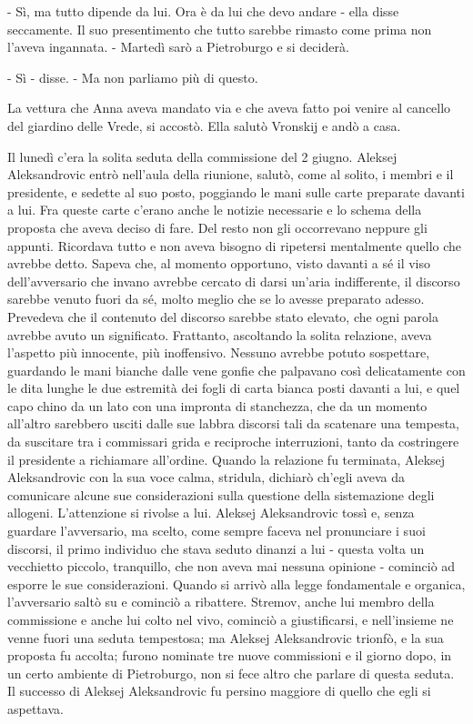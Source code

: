 - Sì, ma tutto dipende da lui. Ora è da lui che devo andare - ella disse seccamente. Il suo presentimento che tutto sarebbe rimasto come prima non l'aveva ingannata. - Martedì sarò a Pietroburgo e si deciderà. 

- Sì - disse. - Ma non parliamo più di questo. 

La vettura che Anna aveva mandato via e che aveva fatto poi venire al cancello del giardino delle Vrede, si accostò. Ella salutò Vronskij e andò a casa. 

\label{xxiii-2} 

Il lunedì c'era la solita seduta della commissione del 2 giugno. Aleksej Aleksandrovic entrò nell'aula della riunione, salutò, come al solito, i membri e il presidente, e sedette al suo posto, poggiando le mani sulle carte preparate davanti a lui. Fra queste carte c'erano anche le notizie necessarie e lo schema della proposta che aveva deciso di fare. Del resto non gli occorrevano neppure gli appunti. Ricordava tutto e non aveva bisogno di ripetersi mentalmente quello che avrebbe detto. Sapeva che, al momento opportuno, visto davanti a sé il viso dell'avversario che invano avrebbe cercato di darsi un'aria indifferente, il discorso sarebbe venuto fuori da sé, molto meglio che se lo avesse preparato adesso. Prevedeva che il contenuto del discorso sarebbe stato elevato, che ogni parola avrebbe avuto un significato. Frattanto, ascoltando la solita relazione, aveva l'aspetto più innocente, più inoffensivo. Nessuno avrebbe potuto sospettare, guardando le mani bianche dalle vene gonfie che palpavano così delicatamente con le dita lunghe le due estremità dei fogli di carta bianca posti davanti a lui, e quel capo chino da un lato con una impronta di stanchezza, che da un momento all'altro sarebbero usciti dalle sue labbra discorsi tali da scatenare una tempesta, da suscitare tra i commissari grida e reciproche interruzioni, tanto da costringere il presidente a richiamare all'ordine. Quando la relazione fu terminata, Aleksej Aleksandrovic con la sua voce calma, stridula, dichiarò ch'egli aveva da comunicare alcune sue considerazioni sulla questione della sistemazione degli allogeni. L'attenzione si rivolse a lui. Aleksej Aleksandrovic tossì e, senza guardare l'avversario, ma scelto, come sempre faceva nel pronunciare i suoi discorsi, il primo individuo che stava seduto dinanzi a lui - questa volta un vecchietto piccolo, tranquillo, che non aveva mai nessuna opinione - cominciò ad esporre le sue considerazioni. Quando si arrivò alla legge fondamentale e organica, l'avversario saltò su e cominciò a ribattere. Stremov, anche lui membro della commissione e anche lui colto nel vivo, cominciò a giustificarsi, e nell'insieme ne venne fuori una seduta tempestosa; ma Aleksej Aleksandrovic trionfò, e la sua proposta fu accolta; furono nominate tre nuove commissioni e il giorno dopo, in un certo ambiente di Pietroburgo, non si fece altro che parlare di questa seduta. Il successo di Aleksej Aleksandrovic fu persino maggiore di quello che egli si aspettava. 

